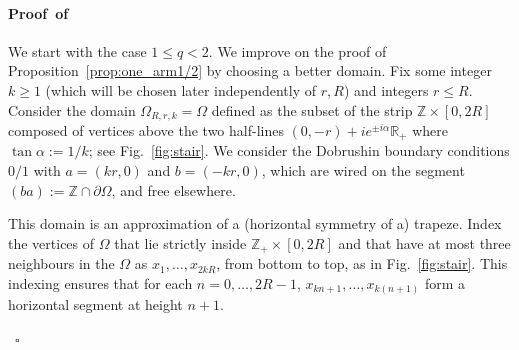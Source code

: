 \documentclass[a4paper,oneside,11pt]{article}
\numberwithin{equation}{section}
\numberwithin{equation}{section}
\numberwithin{equation}{section}
\newenvironment{proof}[1][\relax]%
  {\paragraph{Proof\ifx#1\relax\else~of #1\fi}}%
  {~\hfill$\square$\par\bigskip}
\newcommand{\bbR}{\mathbb{R}}
\newcommand{\bbZ}{\mathbb{Z}}
\begin{document}
\begin{proof}
We start with the case $1\le q<2$. We improve on the proof of Proposition~\ref{prop:one_arm1/2} by choosing a better domain. 
Fix some integer $k \ge 1$ (which will be chosen later independently of $r,R$) and integers $r \le R$.
Consider the domain $\Omega_{R,r,k}=\Omega$ defined as the subset of the strip $\mathbb Z\times [0,2R]$ composed of vertices above the two half-lines $(0,-r )+ie^{\pm i\alpha}\bbR_+$ where $\tan\alpha:=1/k$; see Fig.~\ref{fig:stair}. 
We consider the Dobrushin boundary conditions $0/1$ with $a=(kr,0)$ and $b=(-kr,0)$, which are wired on the segment $(ba):=\bbZ\cap\partial\Omega$, and free elsewhere.  

This domain is an approximation of a (horizontal symmetry of a) trapeze. 
Index the vertices of $\Omega$ that lie strictly inside $\bbZ_+\times[0,2R]$ and that have at most three neighbours in the $\Omega$ as $x_1,\dots,x_{2kR}$, from bottom to top, as in Fig.~\ref{fig:stair}. 
This indexing ensures that for each $n =0,\dots, 2R-1$, $x_{kn+1},\dots,x_{k(n+1)}$ form a horizontal segment at height $n+1$.


\end{proof}
\end{document}
